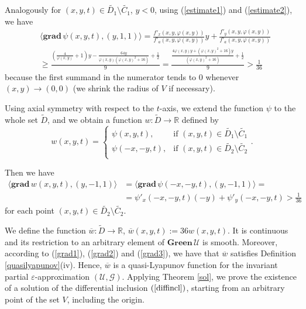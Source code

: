\documentclass[a4paper]{article}
\begin{document}
Analogously for $(x,y,t) \in \widetilde{D_1} \setminus \widetilde{C_1}$, $y<0$, using (\ref{estimate1}) and (\ref{estimate2}), we have
\begin{equation}\label{grad2}
    \begin{aligned}
        &\langle \mathbf{grad} \,\psi(x,y,t), (y,1,1) \rangle = \frac{f'_x(x,y,\varphi(x,y))}{f'_a(x,y,\varphi(x,y))} y + \frac{f'_ y(x,y,\varphi(x,y))}{f'_a(x,y,\varphi(x,y))} \\&\ge \frac{\left(\frac{4}{\varphi(x,y)}+1\right)y - \frac{64y}{\varphi(x,y)(\varphi(x,y)^2+16)} + \frac{1}{2}}{9}= \frac{\frac{4\varphi(x,y)y + (\varphi(x,y)^2+16)y}{(\varphi(x,y)^2+16)}+\frac{1}{2}}{9} > \frac{1}{36}
    \end{aligned}
\end{equation}
because the first summand in the numerator tends to $0$ whenever $(x,y) \to (0,0)$   (we shrink the radius of $V$ if necessary).

Using axial symmetry with respect to the $t$-axis, we extend the function $\psi$ to the whole set $\widetilde{D}$, and we obtain a function $w : \widetilde{D} \to \mathbb{R}$ defined by
\begin{equation*}
    w(x,y,t) = \begin{cases}
        \psi(x,y,t), &\text{if } (x,y,t) \in \widetilde{D_1} \setminus \widetilde{C_1}\\
        \psi(-x,-y,t), &\text{if } (x,y,t) \in \widetilde{D_2} \setminus \widetilde{C_2}\\
    \end{cases}.
\end{equation*}

Then we have
\begin{equation}\label{grad3}
    \begin{aligned}
        \langle \mathbf{grad} \,w(x,y,t), (y,-1,1) \rangle
    &= \langle \mathbf{grad} \,\psi(-x,-y,t), (y,-1,1) \rangle = \\
    &= \psi'_x(-x,-y,t)(-y)+\psi'_y(-x,-y,t) > \frac{1}{36}
    \end{aligned}
\end{equation}
for each point $(x,y,t) \in \widetilde{D_2} \setminus \widetilde{C_2}$.

We define the function $\overline{w}: \widetilde{D} \to \mathbb{R}$, $\overline{w}(x,y,t):=36w(x,y,t)$. It is continuous and its restriction to an arbitrary element of $\mathbf{Green} \,\mathcal{U}$ is smooth. Moreover, according to (\ref{grad1}), (\ref{grad2}) and (\ref{grad3}), we have that $\overline{w}$ satisfies Definition \ref{quasilyapunov}(iv). Hence, $\overline{w}$ is a quasi-Lyapunov function for the invariant partial $\varepsilon$-approximation $(\mathcal{U},\mathcal{G})$. Applying Theorem \ref{sol}, we prove the existence of a solution of the differential inclusion $(\ref{diffincl})$, starting from an arbitrary point of the set $V$, including the origin.
\end{document}
